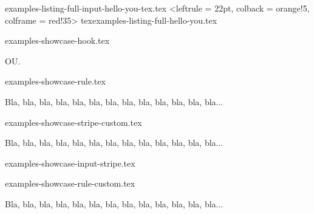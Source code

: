 \begin{filecontents*}[overwrite]{examples-listing-full-input-hello-you-tex.tex}
\tdoccodeinput[style = solarized-light, linenos]%
              <leftrule = 22pt, colback = orange!5, colframe = red!35>%
              {tex}{examples-listing-full-hello-you.tex}
\end{filecontents*}


\begin{filecontents*}[overwrite]{examples-showcase-hook.tex}
\begin{tdocshowcase}
\end{tdocshowcase}

OU.

\begin{tdocshowcase}
\end{tdocshowcase}
\end{filecontents*}


\begin{filecontents*}[overwrite]{examples-showcase-rule.tex}
\begin{tdocshowcase}[style = rule]
    Bla, bla, bla, bla, bla, bla, bla, bla, bla, bla, bla, bla, bla...
\end{tdocshowcase}
\end{filecontents*}


\begin{filecontents*}[overwrite]{examples-showcase-stripe-custom.tex}
\begin{tdocshowcase}[style      = stripe,
                     col-stripe = green,
                     col-text   = purple,
                     before     = Mon début,
                     after      = Ma fin à moi]
    Bla, bla, bla, bla, bla, bla, bla, bla, bla, bla, bla, bla, bla...
\end{tdocshowcase}
\end{filecontents*}


\begin{filecontents*}[overwrite]{examples-showcase-input-stripe.tex}
\end{filecontents*}


\begin{filecontents*}[overwrite]{examples-showcase-rule-custom.tex}
\begin{tdocshowcase}[style      = rule,
                     col-stripe = red,
                     col-text   = orange!75!black,
                     before     = Mon début,
                     after      = Ma fin à moi]
    Bla, bla, bla, bla, bla, bla, bla, bla, bla, bla, bla, bla, bla...
\end{tdocshowcase}
\end{filecontents*}


